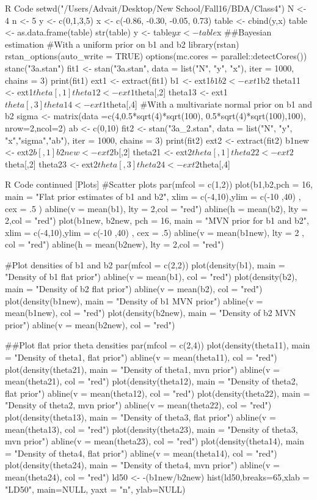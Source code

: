 \documentclass{article}
\begin{document}
\begin{sexylisting}{R Code}
setwd("/Users/Advait/Desktop/New School/Fall16/BDA/Class4")
N <- 4
n <- 5
y <- c(0,1,3,5)
x  <- c(-0.86, -0.30, -0.05, 0.73)
table <- cbind(y,x)
table <- as.data.frame(table)
str(table)
y <- table$y
x <- table$x
##Bayesian estimation
#With a uniform prior on b1 and b2
library(rstan)
rstan_options(auto_write = TRUE)
options(mc.cores = parallel::detectCores())
stanc("3a.stan")
fit1 <- stan("3a.stan", data = list("N", "y", "x"),
                  iter = 1000, chains = 3)
print(fit1)
ext1 <- extract(fit1)
b1 <- ext1$b1
b2 <- ext1$b2
theta11 <- ext1$theta[,1]
theta12 <- ext1$theta[,2]
theta13 <- ext1$theta[,3]
theta14 <- ext1$theta[,4]
#With a multivariate normal prior on b1 and b2
sigma <- matrix(data =c(4,0.5*sqrt(4)*sqrt(100),
                                       0.5*sqrt(4)*sqrt(100),100),
                                       nrow=2,ncol=2)
ab <- c(0,10)
fit2 <- stan("3a_2.stan", data = list("N", "y", "x","sigma","ab"),
                  iter = 1000, chains = 3)
print(fit2)
ext2 <- extract(fit2)
b1new <- ext2$b[,1]
b2new <- ext2$b[,2]
theta21 <- ext2$theta[,1]
theta22 <- ext2$theta[,2]
theta23 <- ext2$theta[,3]
theta24 <- ext2$theta[,4]
\end{sexylisting}
\begin{sexylisting}{R Code continued [Plots]}
#Scatter plots
par(mfcol = c(1,2))
plot(b1,b2,pch = 16, main = "Flat prior estimates of b1 and b2", 
     xlim = c(-4,10),ylim = c(-10 ,40) , cex = .5 )
abline(v = mean(b1), lty = 2,col = "red")
abline(h = mean(b2), lty = 2,col = "red")
plot(b1new, b2new, pch  = 16, main = "MVN prior for b1 and b2",
     xlim = c(-4,10),ylim = c(-10 ,40) , cex = .5)
abline(v = mean(b1new), lty = 2 , col = "red")
abline(h = mean(b2new), lty = 2,col = "red")

#Plot densities of b1 and b2
par(mfcol = c(2,2))
plot(density(b1), main = "Density of b1 flat prior")
abline(v = mean(b1), col = "red")
plot(density(b2), main = "Density of b2 flat prior")
abline(v = mean(b2), col = "red")
plot(density(b1new), main = "Density of b1 MVN prior")
abline(v = mean(b1new), col = "red")
plot(density(b2new), main = "Density of b2 MVN prior")
abline(v = mean(b2new), col = "red")

##Plot flat prior theta densities
par(mfcol = c(2,4))
plot(density(theta11), main = "Density of theta1, flat prior")
abline(v = mean(theta11), col = "red")
plot(density(theta21), main = "Density of theta1, mvn prior")
abline(v = mean(theta21), col = "red")
plot(density(theta12), main = "Density of theta2, flat prior")
abline(v = mean(theta12), col = "red")
plot(density(theta22), main = "Density of theta2, mvn prior")
abline(v = mean(theta22), col = "red")
plot(density(theta13), main = "Density of theta3, flat prior")
abline(v = mean(theta13), col = "red")
plot(density(theta23), main = "Density of theta3, mvn prior")
abline(v = mean(theta23), col = "red")
plot(density(theta14), main = "Density of theta4, flat prior")
abline(v = mean(theta14), col = "red")
plot(density(theta24), main = "Density of theta4, mvn prior")
abline(v = mean(theta24), col = "red")
ld50 <- -(b1new/b2new)
hist(ld50,breaks=65,xlab = "LD50", main=NULL, yaxt = "n", ylab=NULL)
\end{sexylisting}
\end{document}
